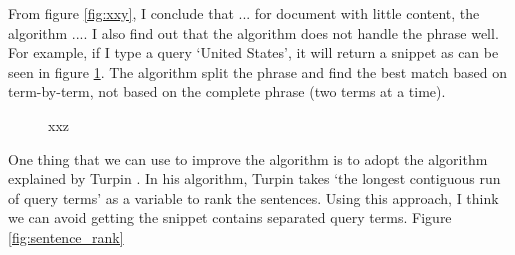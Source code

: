 \documentclass[letterpaper,11pt]{article}
\begin{document}
From figure \ref{fig:xxy}, I conclude that ... for document with little content, the algorithm .... I also find out that the algorithm does not handle the phrase well. For example, if I type a query `United States', it will return a snippet as can be seen in figure \ref{fig:xxz}. The algorithm split the phrase and find the best match based on term-by-term, not based on the complete phrase (two terms at a time). 

\begin{figure}[H]
	\centering
	\caption{xxz}
	\label{fig:xxz}
\end{figure}

One thing that we can use to improve the algorithm is to adopt the algorithm explained by Turpin \cite{Turpin:2007:FGR:1277741.1277766}. In his algorithm, Turpin \cite{Turpin:2007:FGR:1277741.1277766} takes `the longest contiguous run of query terms' as a variable to rank the sentences. Using this approach, I think we can avoid getting the snippet contains separated query terms. Figure \ref{fig:sentence_rank}
\end{document}
